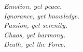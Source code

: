 \begin{epigrafe}
    \vspace*{\fill}
	\begin{flushright}
	\textit{Emotion, yet peace. \\
    Ignorance, yet knowledge. \\
    Passion, yet serenity. \\
    Chaos, yet harmony. \\
    Death, yet the Force. }
	\end{flushright}
\end{epigrafe}
